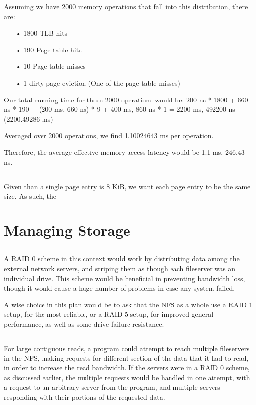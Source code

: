 \documentclass{article}
\begin{document}
Assuming we have 2000 memory operations that fall into this distribution, there are:
\begin{itemize}
\item[•] 1800 TLB hits
\item[•] 190 Page table hits
\item[•] 10 Page table misses
\item[•] 1 dirty page eviction (One of the page table misses)
\end{itemize}

Our total running time for those 2000 operations would be:
200 ns * 1800 + 660 ns * 190 + (200 ms, 660 ns) * 9 + 400 ms, 860 ns * 1 = 2200 ms, 492200 ns (2200.49286 ms)
 
Averaged over 2000 operations, we find 1.10024643 ms per operation.
 
Therefore, the average effective memory access latency would be 1.1 ms, 246.43 ns.

\subsection{}


\subsection{}
Given than a single page entry is 8 KiB, we want each page entry to be the same size. As such, the 

\setcounter{section}{5}
\setcounter{subsection}{0}
\section*{Managing Storage}
\subsection{}
A RAID 0 scheme in this context would work by distributing data among the external network servers, and striping them as though each fileserver was an individual drive. This scheme would be beneficial in preventing bandwidth loss, though it would cause a huge number of problems in case any system failed.

A wise choice in this plan would be to ask that the NFS as a whole use a RAID 1 setup, for the most reliable, or a RAID 5 setup, for improved general performance, as well as some drive failure resistance.

\subsection{}
For large contiguous reads, a program could attempt to reach multiple fileservers in the NFS, making requests for different section of the data that it had to read, in order to increase the read bandwidth. If the servers were in a RAID 0 scheme, as discussed earlier, the multiple requests would be handled in one attempt, with a request to an arbitrary server from the program, and multiple servers responding with their portions of the requested data.
\end{document}
